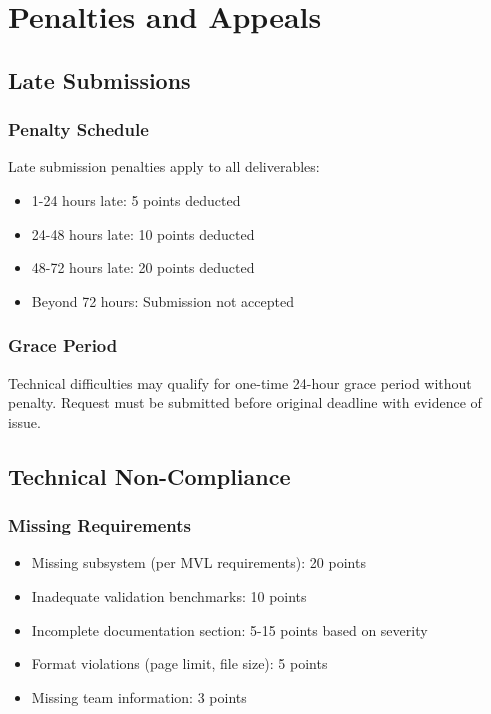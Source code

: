 
\renewcommand{\thesection}{A}
\section{Penalties and Appeals}

\subsection{Late Submissions}

\subsubsection{Penalty Schedule}
Late submission penalties apply to all deliverables:
\begin{itemize}[noitemsep]
    \item 1-24 hours late: 5 points deducted
    \item 24-48 hours late: 10 points deducted
    \item 48-72 hours late: 20 points deducted
    \item Beyond 72 hours: Submission not accepted
\end{itemize}

\subsubsection{Grace Period}
Technical difficulties may qualify for one-time 24-hour grace period without penalty. Request must be submitted before original deadline with evidence of issue.

\subsection{Technical Non-Compliance}

\subsubsection{Missing Requirements}
\begin{itemize}[noitemsep]
    \item Missing subsystem (per MVL requirements): 20 points
    \item Inadequate validation benchmarks: 10 points
    \item Incomplete documentation section: 5-15 points based on severity
    \item Format violations (page limit, file size): 5 points
    \item Missing team information: 3 points
\end{itemize}

